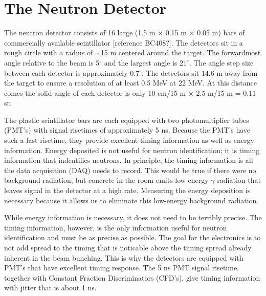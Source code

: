 \section{The Neutron Detector}

The neutron detector consists of 16 large (1.5 m $\times$ 0.15 m $\times$ 0.05 m) bars of commercially available scintillator [reference BC408?].  The detectors sit in a rough circle with a radius of $\sim$15 m centered around the target.  The forwardmost angle relative to the beam is 5$^{\circ}$ and the largest angle is $21^{\circ}$.  The angle step size between each detector is approximately 0.7$^{\circ}$.  The detectors sit 14.6 m away from the target to ensure a resolution of at least 0.5 MeV at 22 MeV.  At this distance comes the solid angle of each detector is only 10 cm/15 m $\times$ 2.5 m/15 m = 0.11 sr.


The plastic scintillator bars are each equipped with two photomultiplier tubes (PMT's) with signal risetimes of approximately 5 ns.  Because the PMT's have such a fast risetime, they provide excellent timing information as well as energy information.  Energy deposited is not useful for neutron identification; it is timing information that indentifies neutrons.  In principle, the timing information is all the data acquisition (DAQ) needs to record.  This would be true if there were no background radiation, but concrete in the room emits low-energy $\gamma$ radiation that leaves signal in the detector at a high rate.  Measuring the energy deposition is necessary because it allows us to eliminate this low-energy background radiation.  

While energy information is necessary, it does not need to be terribly precise.  The timing information, however, is the only information useful for neutron identification and must be as precise as possible.  The goal for the electronics is to not add spread to the timing that is noticable above the timing spread already inherent in the beam bunching.  This is why the detectors are equipped with PMT's that have excellent timing response.  The 5 ns PMT signal risetime, together with Constant Fraction Discriminators (CFD's), give timing information with jitter that is about 1 ns.

